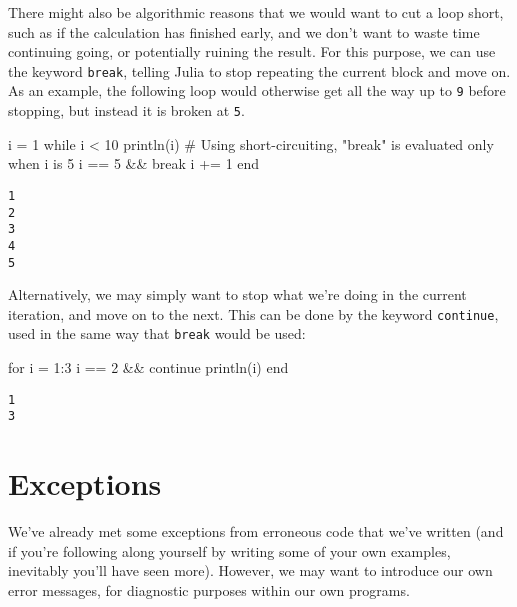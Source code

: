 \documentclass[
  letterpaper,
  DIV=11,
  numbers=noendperiod]{scrreprt}
\newenvironment{Shaded}{\begin{snugshade}}{\end{snugshade}}
\newcommand{\CommentTok}[1]{\textcolor[rgb]{0.37,0.37,0.37}{#1}}
\newcommand{\ControlFlowTok}[1]{\textcolor[rgb]{0.00,0.23,0.31}{#1}}
\newcommand{\FloatTok}[1]{\textcolor[rgb]{0.68,0.00,0.00}{#1}}
\newcommand{\FunctionTok}[1]{\textcolor[rgb]{0.28,0.35,0.67}{#1}}
\newcommand{\NormalTok}[1]{\textcolor[rgb]{0.00,0.23,0.31}{#1}}
\newcommand{\OperatorTok}[1]{\textcolor[rgb]{0.37,0.37,0.37}{#1}}
\begin{document}
There might also be algorithmic reasons that we would want to cut a loop
short, such as if the calculation has finished early, and we don't want
to waste time continuing going, or potentially ruining the result. For
this purpose, we can use the keyword \texttt{break}, telling Julia to
stop repeating the current block and move on. As an example, the
following loop would otherwise get all the way up to \texttt{9} before
stopping, but instead it is broken at \texttt{5}.

\begin{Shaded}
\begin{Highlighting}[]
\NormalTok{i }\OperatorTok{=} \FloatTok{1}
\ControlFlowTok{while}\NormalTok{ i }\OperatorTok{\textless{}} \FloatTok{10}
    \FunctionTok{println}\NormalTok{(i)}
    \CommentTok{\# Using short{-}circuiting, "break" is evaluated only when i is 5}
\NormalTok{    i }\OperatorTok{==} \FloatTok{5} \OperatorTok{\&\&} \ControlFlowTok{break}
\NormalTok{    i }\OperatorTok{+=} \FloatTok{1}
\ControlFlowTok{end}
\end{Highlighting}
\end{Shaded}

\begin{verbatim}
1
2
3
4
5
\end{verbatim}

Alternatively, we may simply want to stop what we're doing in the
current iteration, and move on to the next. This can be done by the
keyword \texttt{continue}, used in the same way that \texttt{break}
would be used:

\begin{Shaded}
\begin{Highlighting}[]
\ControlFlowTok{for}\NormalTok{ i }\OperatorTok{=} \FloatTok{1}\OperatorTok{:}\FloatTok{3}
\NormalTok{    i }\OperatorTok{==} \FloatTok{2} \OperatorTok{\&\&} \ControlFlowTok{continue}
    \FunctionTok{println}\NormalTok{(i)}
\ControlFlowTok{end}
\end{Highlighting}
\end{Shaded}

\begin{verbatim}
1
3
\end{verbatim}

\hypertarget{sec-controlflow_exceptions}{%
\section{Exceptions}\label{sec-controlflow_exceptions}}

We've already met some exceptions from erroneous code that we've written
(and if you're following along yourself by writing some of your own
examples, inevitably you'll have seen more). However, we may want to
introduce our own error messages, for diagnostic purposes within our own
programs.
\end{document}
